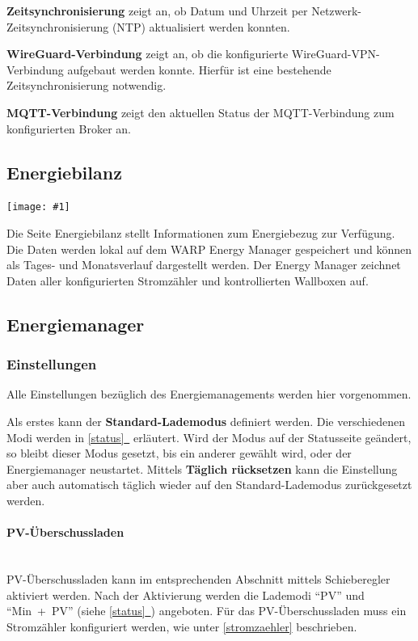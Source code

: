 \documentclass[a4paper,10pt]{article}
\newcommand{\gfx}[1]{\texttt{[image: \#1]}}
\newcommand*{\fullref}[1]{\hyperref[{#1}]{\ref*{#1}~\nameref*{#1}}}
\begin{document}
\begin{multicols*}{2}
	\textbf{Zeitsynchronisierung} zeigt an, ob Datum und Uhrzeit per Netzwerk-Zeitsynchronisierung (NTP) aktualisiert werden konnten.

	\textbf{WireGuard-Verbindung} zeigt an, ob die konfigurierte WireGuard-VPN-Verbindung aufgebaut werden konnte. Hierfür ist eine bestehende Zeitsynchronisierung notwendig.

	\textbf{MQTT-Verbindung} zeigt den aktuellen Status der MQTT-Verbindung
	zum konfigurierten Broker an.

	\subsection{Energiebilanz}

	\gfx{./img/resized/web_em_energy_analysis}
	\vspace{-0.2cm}

	Die Seite Energiebilanz stellt Informationen zum Energiebezug zur Verfügung.
	Die Daten werden lokal auf dem WARP Energy Manager gespeichert und
	können als Tages- und Monatsverlauf dargestellt werden.
	Der Energy Manager zeichnet Daten aller konfigurierten Stromzähler und kontrollierten Wallboxen auf.

	\vspace{-0.3cm}
	\subsection{Energiemanager}
	\subsubsection{Einstellungen}
	\label{energy_manager_settings}

	Alle Einstellungen bezüglich des Energiemanagements werden hier vorgenommen.

	Als erstes kann der \textbf{Standard-Lademodus} definiert werden. Die
	verschiedenen Modi werden in \fullref{status} erläutert.
	Wird der Modus auf der Statusseite geändert, so bleibt dieser Modus gesetzt, bis ein anderer gewählt wird,
	oder der Energiemanager neustartet.
	Mittels \textbf{Täglich rücksetzen} kann die Einstellung aber auch
	automatisch täglich wieder auf den Standard-Lademodus zurückgesetzt werden.

	\vspace{-0.2cm}
	\paragraph{PV-Überschussladen}\ \\
	PV-Überschussladen kann im entsprechenden Abschnitt mittels
	Schieberegler aktiviert werden. Nach der Aktivierung werden die Lademodi
	\enquote{PV} und \enquote{Min~+~PV} (siehe \fullref{status}) angeboten. Für das PV-Überschussladen muss ein	Stromzähler konfiguriert werden, wie unter \ref{stromzaehler} beschrieben.


\end{multicols*}
\end{document}
